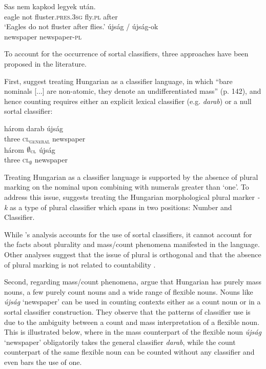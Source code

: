 \documentclass[output=paper]{langscibook}
\begin{document}
\ea \label{schv-nem:ex:4}
\gll Sas nem kapkod legyek után.\\
    eagle not fluster.\textsc{pres}.\textsc{3sg} fly.\textsc{pl}  after\\
\glt `Eagles do not fluster after flies.'
\ex \label{schv-nem:ex:5}
\gll újság / újság-ok\\
   newspaper {} newspaper-\textsc{pl}\\
\z

\noindent To account for the occurrence of sortal classifiers, three approaches have been proposed in the literature.

First, \citet{csirmaz-dekany-14} suggest treating Hungarian as a classifier language, in which ``bare nominals [...] are non-atomic, they denote an undifferentiated mass'' (p. 142), and hence counting requires either an explicit lexical classifier (e.g. \textit{darab}) or a null sortal classifier:

\ea \label{schv-nem:ex:6}
\ea \label{schv-nem:ex:6a}
\gll három darab újság\\  
     three \textsc{cl\textsubscript{general}} newspaper\\ 
\ex \label{schv-nem:ex:6b}
\gll három $\emptyset_{\textsc{cl}}$  újság\\
   three \textsc{cl$_{\emptyset}$} newspaper\\
\z
\z

\noindent Treating Hungarian as a classifier language is supported by the absence of plural marking on the nominal upon combining with numerals greater than ‘one’. To address this issue, \citet{dekany-11} suggests treating the Hungarian morphological plural marker \textit{-k} as a type of plural classifier which spans in two positions: Number and Classifier.

While \citeauthor{csirmaz-dekany-14}'s analysis accounts for the use of sortal classifiers, it cannot account for the facts about plurality and mass/count phenomena manifested in the language. Other analyses suggest that the issue of plural is orthogonal and that the absence of plural marking is not related to countability \citep{borer-05, schvarcz-rothstein-17}.

Second, regarding mass/count phenomena, \citet{schvarcz-rothstein-17} argue that  Hungarian has purely mass nouns, a few purely count nouns and a wide range of flexible nouns. Nouns like \textit{újság} `newspaper' can be used in counting contexts either as a count noun or in a sortal classifier construction. They observe that the patterns of classifier use is due to the ambiguity between a count and mass interpretation of a flexible noun. This is illustrated below, where in  the mass counterpart of the flexible noun \textit{újság} `newspaper’ obligatorily takes the general classifier \textit{darab}, while the count counterpart of the same flexible noun  can be counted without any classifier and even bars the use of one. 
\end{document}
